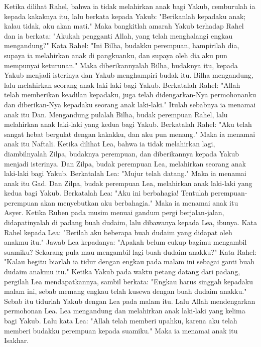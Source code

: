 \begin{biblechapter} %
\verse Ketika dilihat Rahel, bahwa ia tidak melahirkan anak bagi Yakub, cemburulah ia kepada kakaknya itu, lalu berkata kepada Yakub: "Berikanlah kepadaku anak; kalau tidak, aku akan mati."
\verse Maka bangkitlah amarah Yakub terhadap Rahel dan ia berkata: "Akukah pengganti Allah, yang telah menghalangi engkau mengandung?"
\verse Kata Rahel: "Ini Bilha, budakku perempuan, hampirilah dia, supaya ia melahirkan anak di pangkuanku, dan supaya oleh dia aku pun mempunyai keturunan."
\verse Maka diberikannyalah Bilha, budaknya itu, kepada Yakub menjadi isterinya dan Yakub menghampiri budak itu.
\verse Bilha mengandung, lalu melahirkan seorang anak laki-laki bagi Yakub.
\verse Berkatalah Rahel: "Allah telah memberikan keadilan kepadaku, juga telah didengarkan-Nya permohonanku dan diberikan-Nya kepadaku seorang anak laki-laki." Itulah sebabnya ia menamai anak itu Dan.
\verse Mengandung pulalah Bilha, budak perempuan Rahel, lalu melahirkan anak laki-laki yang kedua bagi Yakub.
\verse Berkatalah Rahel: "Aku telah sangat hebat bergulat dengan kakakku, dan aku pun menang." Maka ia menamai anak itu Naftali.
\verse Ketika dilihat Lea, bahwa ia tidak melahirkan lagi, diambilnyalah Zilpa, budaknya perempuan, dan diberikannya kepada Yakub menjadi isterinya.
\verse Dan Zilpa, budak perempuan Lea, melahirkan seorang anak laki-laki bagi Yakub.
\verse Berkatalah Lea: "Mujur telah datang." Maka ia menamai anak itu Gad.
\verse Dan Zilpa, budak perempuan Lea, melahirkan anak laki-laki yang kedua bagi Yakub.
\verse Berkatalah Lea: "Aku ini berbahagia! Tentulah perempuan-perempuan akan menyebutkan aku berbahagia." Maka ia menamai anak itu Asyer.
\verse Ketika Ruben pada musim menuai gandum pergi berjalan-jalan, didapatinyalah di padang buah dudaim, lalu dibawanya kepada Lea, ibunya. Kata Rahel kepada Lea: "Berilah aku beberapa buah dudaim yang didapat oleh anakmu itu."
\verse Jawab Lea kepadanya: "Apakah belum cukup bagimu mengambil suamiku? Sekarang pula mau mengambil lagi buah dudaim anakku?" Kata Rahel: "Kalau begitu biarlah ia tidur dengan engkau pada malam ini sebagai ganti buah dudaim anakmu itu."
\verse Ketika Yakub pada waktu petang datang dari padang, pergilah Lea mendapatkannya, sambil berkata: "Engkau harus singgah kepadaku malam ini, sebab memang engkau telah kusewa dengan buah dudaim anakku." Sebab itu tidurlah Yakub dengan Lea pada malam itu.
\verse Lalu Allah mendengarkan permohonan Lea. Lea mengandung dan melahirkan anak laki-laki yang kelima bagi Yakub.
\verse Lalu kata Lea: "Allah telah memberi upahku, karena aku telah memberi budakku perempuan kepada suamiku." Maka ia menamai anak itu Isakhar.

\end{biblechapter}
